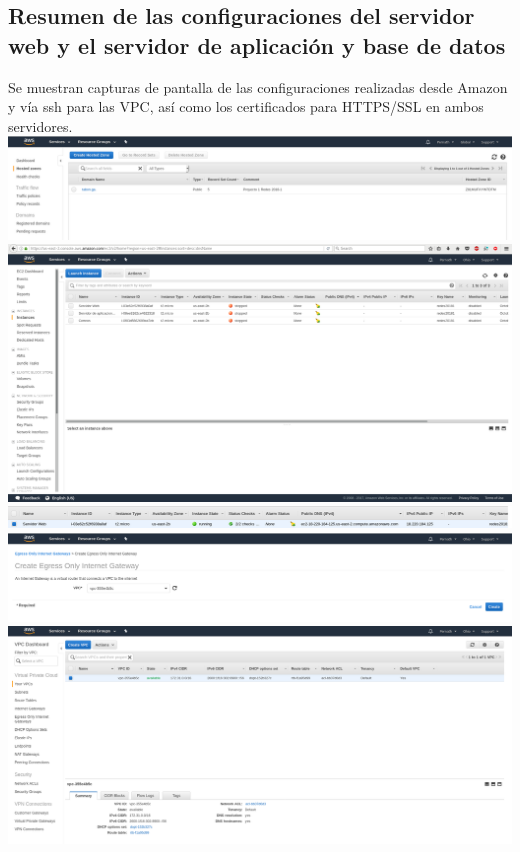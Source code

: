 \documentclass[9pt]{article}
\begin{document}
\subsection*{Resumen de las configuraciones del servidor web y el servidor de aplicación y base de datos}
Se muestran capturas de pantalla de las configuraciones realizadas desde Amazon y vía \textsf{ssh} para las VPC, así como los certificados para \textsf{HTTPS/SSL} en ambos servidores.\\
\includegraphics[width=\textwidth]{HostedZones}
\includegraphics[width=\textwidth]{instances_dashboard}
\includegraphics[width=\textwidth]{web_server}
\includegraphics[width=\textwidth]{egress_only_gateway}
\includegraphics[width=\textwidth]{vpc}
\end{document}
